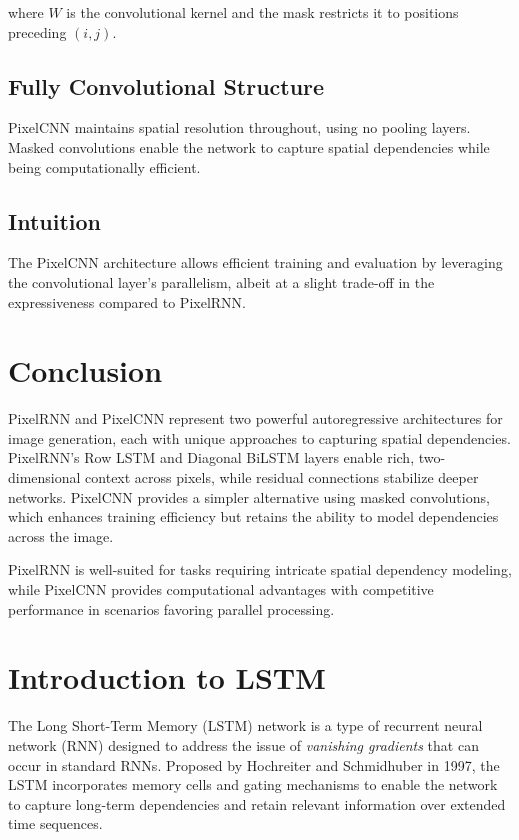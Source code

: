 \documentclass{article}
\begin{document}
where \( W \) is the convolutional kernel and the mask restricts it to positions preceding \( (i, j) \).

\subsection{Fully Convolutional Structure}
PixelCNN maintains spatial resolution throughout, using no pooling layers. Masked convolutions enable the network to capture spatial dependencies while being computationally efficient.

\subsection{Intuition}
The PixelCNN architecture allows efficient training and evaluation by leveraging the convolutional layer’s parallelism, albeit at a slight trade-off in the expressiveness compared to PixelRNN.

\section{Conclusion}
PixelRNN and PixelCNN represent two powerful autoregressive architectures for image generation, each with unique approaches to capturing spatial dependencies. PixelRNN’s Row LSTM and Diagonal BiLSTM layers enable rich, two-dimensional context across pixels, while residual connections stabilize deeper networks. PixelCNN provides a simpler alternative using masked convolutions, which enhances training efficiency but retains the ability to model dependencies across the image.

PixelRNN is well-suited for tasks requiring intricate spatial dependency modeling, while PixelCNN provides computational advantages with competitive performance in scenarios favoring parallel processing.


\section{Introduction to LSTM}
The Long Short-Term Memory (LSTM) network is a type of recurrent neural network (RNN) designed to address the issue of \textit{vanishing gradients} that can occur in standard RNNs. Proposed by Hochreiter and Schmidhuber in 1997, the LSTM incorporates memory cells and gating mechanisms to enable the network to capture long-term dependencies and retain relevant information over extended time sequences.
\end{document}
